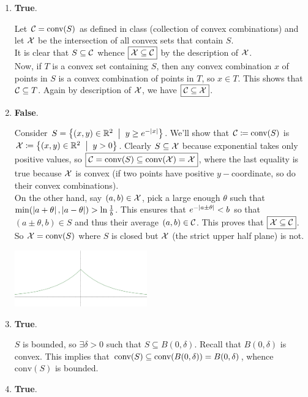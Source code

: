 \begin{enumerate}[leftmargin=*]
\item  \textbf{True}.

Let ${\mathcal{C}}=\text{conv}(S)$ as defined in class (collection of convex combinations) and let ${\mathcal{X}}$ be the intersection of all convex sets that contain $S$. \\It is clear that $S\subseteq {\mathcal{C}}$ whence $\boxed{{\mathcal{X}}\subseteq {\mathcal{C}}}$ by the description of ${\mathcal{X}}$. \\Now, if $T$ is a convex set containing $S$, then any convex combination $x$ of points in $S$ is a convex combination of points in $T$, so $x\in T$. This shows that ${\mathcal{C}}\subseteq T$. Again by description of ${\mathcal{X}}$, we have $\boxed{{\mathcal{C}}\subseteq {\mathcal{X}}}$.

\item \textbf{False}.

\begin{multicols}{2}
Consider $S = \set{(x,y)\in\R^{2}\st y\ge e^{-\abs x}}$. We'll show that ${\mathcal{C}}\coloneqq\text{conv} (S)$ is $\cX\sett\set{(x,y)\in\R^{2}\st y>0}$. Clearly $S\subseteq{\mathcal{X}}$ because exponential takes only positive values, so $\boxed{{\mathcal{C}}=\text{conv}(S)\subseteq \text{conv}({\mathcal{X}}) = {\mathcal{X}}}$, where the last equality is true because ${\mathcal{X}}$ is convex (if two points have positive $y-$coordinate, so do their convex combinations). \\On the other hand, say $(a,b)\in{\mathcal{X}}$, pick a large enough $\theta$ such that $\min(\left| a+\theta \right|, \left| a-\theta \right|) > \ln\frac1b$. This ensures that $e^{-\left| a\pm\theta \right|} < b$ so that $(a\pm\theta,b)\in S$ and thus their average $(a,b)\in {\mathcal{C}}$. This proves that $\boxed{{\mathcal{X}}\subseteq {\mathcal{C}}}$. \\
So ${\mathcal{X}} = \text{conv}(S)$ where $S$ is closed but ${\mathcal{X}}$ (the strict upper half plane) is not.


\includegraphics[width=0.45\textwidth]{closed.png}
\end{multicols}

\item \textbf{True}.

$S$ is bounded, so $\exists\delta>0$ such that $S\subseteq B(0,\delta)$. Recall that $B(0,\delta)$ is convex. This implies that $\text{conv}(S)\subseteq \text{conv}(B(0,\delta)) = B(0,\delta)$, whence $\text{conv}(S)$ is bounded.
\item \textbf{True}.


\end{enumerate}
